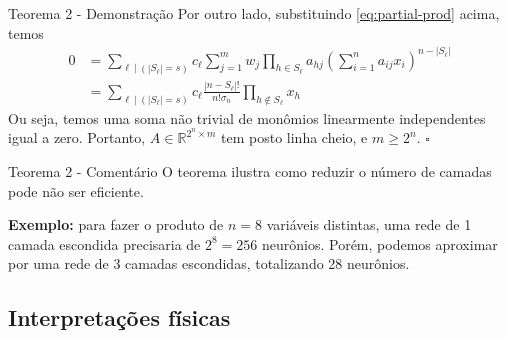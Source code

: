\documentclass{beamer}
\begin{document}
\begin{frame}{Teorema 2 - Demonstração}
    Por outro lado, substituindo \eqref{eq:partial-prod} acima, temos
    \begin{align*}
        0 &= \sum_{\ell \ | \ (|S_{\ell}| = s)} c_{\ell} \sum_{j=1}^{m} w_{j} \prod_{h \in S_{\ell}} a_{hj} \left( \sum_{i=1}^{n} a_{ij} x_{i} \right)^{n - |S_{\ell}|}\\
        &= \sum_{\ell \ | \ (|S_{\ell}| = s)} c_{\ell} \frac{|n-S_\ell|!}{n!\sigma_n} \prod_{h \notin S_\ell} x_h         
    \end{align*}
    \pause
    Ou seja, temos uma soma não trivial de monômios linearmente independentes igual a zero. Portanto, $A \in \mathbb R^{2^n \times m}$ tem posto linha cheio, e $m \geq 2^n$. $\square$
\end{frame}

\begin{frame}{Teorema 2 - Comentário}
    O teorema ilustra como reduzir o número de camadas pode não ser eficiente. 
    \vspace{1em}
    
    \textbf{Exemplo:} para fazer o produto de $n=8$ variáveis distintas, uma rede de 1 camada escondida precisaria de $2^8=256$ neurônios. Porém, podemos aproximar por uma rede de 3 camadas escondidas, totalizando 28 neurônios.
\end{frame}

\subsection{Interpretações físicas}
\begin{frame}
    \tableofcontents[currentsection]
\end{frame}
\end{document}
